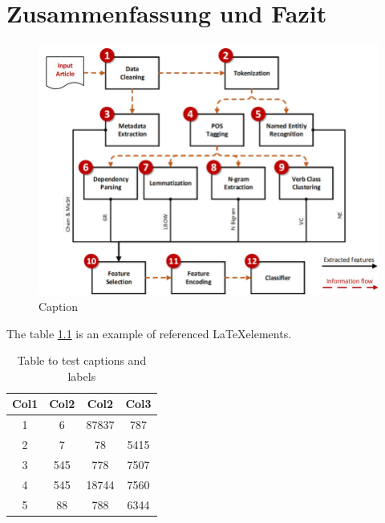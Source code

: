 \chapter{Zusammenfassung und Fazit}

\begin{figure}
    \centering
    \includegraphics[width=\textwidth]{media/The-NLP-pipeline-for-automatic-classification-of-document-abstracts-Chem-Chemical.png}
    \caption{Caption}
    \label{fig:my_label}
\end{figure}

The table \ref{table:1} is an example of referenced \LaTeX elements.

\begin{table}[h!]
\centering
\begin{tabular}{||c c c c||} 
 \hline
 Col1 & Col2 & Col2 & Col3 \\ [0.5ex] 
 \hline\hline
 1 & 6 & 87837 & 787 \\ 
 2 & 7 & 78 & 5415 \\
 3 & 545 & 778 & 7507 \\
 4 & 545 & 18744 & 7560 \\
 5 & 88 & 788 & 6344 \\ [1ex] 
 \hline
\end{tabular}
\caption{Table to test captions and labels}
\label{table:1}
\end{table}
